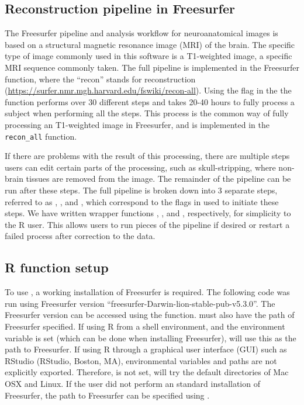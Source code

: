 \subsection{Reconstruction pipeline in
Freesurfer}\label{reconstruction-pipeline-in-freesurfer}

The Freesurfer pipeline and analysis workflow for neuroanatomical images
is based on a structural magnetic resonance image (MRI) of the brain.
The specific type of image commonly used in this software is a
T1-weighted image, a specific MRI sequence commonly taken. The full
pipeline is implemented in the Freesurfer  function,
where the ``recon'' stands for reconstruction
(\url{https://surfer.nmr.mgh.harvard.edu/fswiki/recon-all}). Using the
 flag in the the  function performs over 30
different steps and takes 20-40 hours to fully process a subject when
performing all the steps. This process is the common way of fully
processing an T1-weighted image in Freesurfer, and is implemented in the
\texttt{recon\_all}  function.

If there are problems with the result of this processing, there are
multiple steps users can edit certain parts of the processing, such as
skull-stripping, where non-brain tissues are removed from the image. The
remainder of the pipeline can be run after these steps. The full
pipeline is broken down into 3 separate steps, referred to as
, , and , which
correspond to the flags in  used to initiate these
steps. We have written wrapper functions ,
, and , respectively, for simplicity
to the R user. This allows users to run pieces of the pipeline if
desired or restart a failed process after correction to the data.

\subsection{R function setup}\label{r-function-setup}

To use , a working installation of Freesurfer is
required. The following code was run using Freesurfer version
``freesurfer-Darwin-lion-stable-pub-v5.3.0''. The Freesurfer version can
be accessed using the  function.  must
also have the path of Freesurfer specified. If using R from a shell
environment, and the  environment variable is set
(which can be done when installing Freesurfer),  will
use this as the path to Freesurfer. If using R through a graphical user
interface (GUI) such as RStudio (RStudio, Boston, MA), environmental
variables and paths are not explicitly exported. Therefore,
 is not set,  will try the
default directories of Mac OSX and Linux. If the user did not perform an
standard installation of Freesurfer, the path to Freesurfer can be
specified using .

